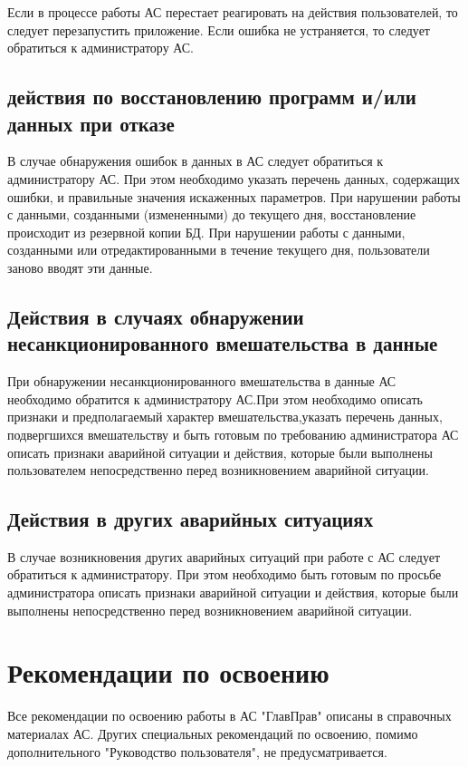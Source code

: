 \documentclass[russian, utf8, 12pt,pointsubsection,floatsubsection]{eskdtext}
\begin{document}
Если в процессе работы АС перестает реагировать на действия пользователей, то следует перезапустить приложение. Если ошибка не устраняется, то следует обратиться к администратору АС.

\subsection{действия по восстановлению программ и/или данных при отказе}

В случае обнаружения ошибок в данных в АС следует обратиться к администратору АС. При этом необходимо указать перечень данных, содержащих ошибки, и правильные значения искаженных параметров. При нарушении работы с данными, созданными (измененными) до текущего дня, восстановление происходит из резервной копии БД. При нарушении работы с данными, созданными или отредактированными в течение текущего дня, пользователи заново вводят эти данные.

\subsection{Действия в случаях обнаружении несанкционированного вмешательства в данные}
При обнаружении несанкционированного вмешательства в данные АС необходимо обратится к администратору АС.При этом необходимо описать признаки и предполагаемый характер вмешательства,указать перечень данных, подвергшихся вмешательству и быть готовым по требованию администратора АС описать признаки аварийной ситуации и действия, которые были
выполнены пользователем непосредственно перед возникновением аварийной ситуации.

\subsection{Действия в других аварийных ситуациях}

В случае возникновения других аварийных ситуаций при работе с АС следует обратиться к администратору. При этом необходимо быть готовым по просьбе администратора описать признаки аварийной ситуации и действия, которые были выполнены непосредственно перед возникновением аварийной ситуации. 

\section{Рекомендации по освоению}


Все рекомендации по освоению работы в АС  "ГлавПрав" описаны в справочных материалах АС. Других специальных рекомендаций по освоению, помимо дополнительного "Руководство пользователя", не предусматривается.
\end{document}
